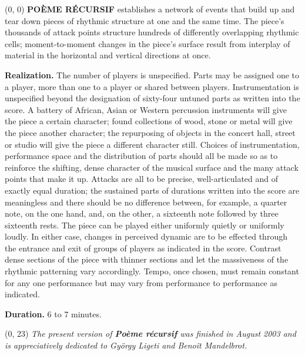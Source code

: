 \documentclass{article}
\begin{document}
\begin{textblock}{12}(0, 0)
\textbf{POÈME RÉCURSIF} establishes a network of events that build up and tear down pieces of rhythmic structure at one and the same time. The piece's thousands of attack points structure hundreds of differently overlapping rhythmic cells; moment-to-moment changes in the piece's surface result from interplay of material in the horizontal and vertical directions at once. 

\textbf{Realization.} The number of players is unspecified. Parts may be assigned one to a player, more than one to a player or shared between players. Instrumentation is unspecified beyond the designation of sixty-four untuned parts as written into the score. A battery of African, Asian or Western percussion instruments will give the piece a certain character; found collections of wood, stone or metal will give the piece another character; the repurposing of objects in the concert hall, street or studio will give the piece a different character still. Choices of instrumentation, performance space and the distribution of parts should all be made so as to reinforce the shifting, dense character of the musical surface and the many attack points that make it up. Attacks are all to be precise, well-articulated and of exactly equal duration; the sustained parts of durations written into the score are meaningless and there should be no difference between, for example, a quarter note, on the one hand, and, on the other, a sixteenth note followed by three sixteenth rests. The piece can be played either uniformly quietly or uniformly loudly. In either case, changes in perceived dynamic are to be effected through the entrance and exit of groups of players as indicated in the score. Contrast dense sections of the piece with thinner sections and let the massiveness of the rhythmic patterning vary accordingly. Tempo, once chosen, must remain constant for any one performance but may vary from performance to performance as indicated.

\textbf{Duration.} 6 to 7 minutes.
\end{textblock}


\begin{textblock}{12}(0, 23)
\textit{The present version of \textbf{Po\`{e}me r\'{e}cursif} was finished in August 2003 and is appreciatively dedicated to Gy\"{o}rgy Ligeti and Beno\^{i}t Mandelbrot.}
\end{textblock}
\end{document}
